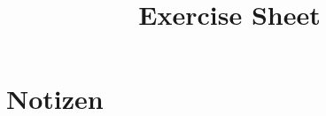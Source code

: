 \documentclass{article}
\title{Exercise Sheet}
\begin{document}
\section{Notizen}









%
%
%
%
%
%
%
%
%
%
%
%
%
%
%
%
%
%
%
%


%
%
%
%
%
%
%
%
%
%
%
%
%
%
%
%
%
%
%
%

\end{document}
